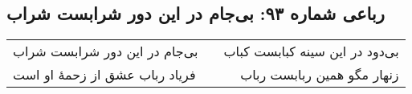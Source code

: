 \begin{center}
\section*{رباعی شماره ۹۳: بی‌جام در این دور شرابست شراب}
\label{sec:0093}
\begin{longtable}{l p{0.5cm} r}
بی‌جام در این دور شرابست شراب
&&
بی‌دود در این سینه کبابست کباب
\\
فریاد رباب عشق از زحمهٔ او است
&&
زنهار مگو همین ربابست رباب
\\
\end{longtable}
\end{center}
